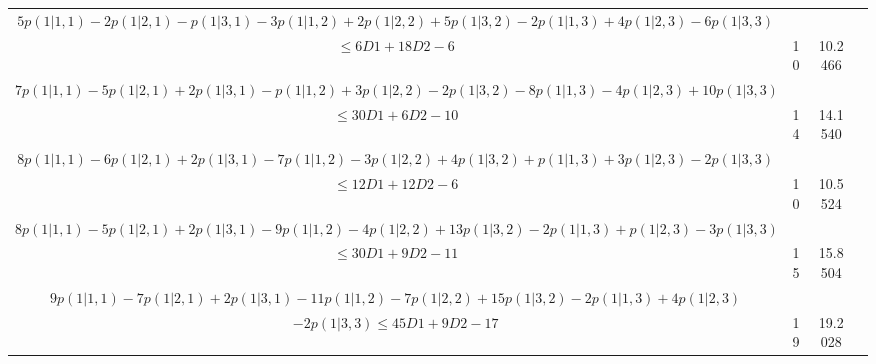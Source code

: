 \documentclass[11pt]{article}
\begin{document}
\begin{table}[htbp]
{\begin{tabular}{|c|c|c|c|}
    $5p(1|1,1) -2p(1|2,1) -p(1|3,1) -3p(1|1,2) +2p(1|2,2) +5p(1|3,2) -2p(1|1,3) +4p(1|2,3) -6p(1|3,3)$&&\\$ \leqslant 6D1 +18D2  -6$& 10 & 10.2466 \\ \hline

    $7p(1|1,1) -5p(1|2,1) +2p(1|3,1) -p(1|1,2) +3p(1|2,2) -2p(1|3,2) -8p(1|1,3) -4p(1|2,3) +10p(1|3,3)$&&\\$ \leqslant 30D1 +6D2  -10$&14 & 14.1540 \\ \hline

    $8p(1|1,1) -6p(1|2,1) +2p(1|3,1) -7p(1|1,2) -3p(1|2,2) +4p(1|3,2) +p(1|1,3) +3p(1|2,3) -2p(1|3,3)$&&\\$ \leqslant 12D1 +12D2  -6$&10 & 10.5524  \\ \hline

    $8p(1|1,1) -5p(1|2,1) +2p(1|3,1) -9p(1|1,2) -4p(1|2,2) +13p(1|3,2) -2p(1|1,3) +p(1|2,3) -3p(1|3,3)$&&\\$ \leqslant 30D1 +9D2  -11$&15 & 15.8504 \\ \hline

    $9p(1|1,1) -7p(1|2,1) +2p(1|3,1) -11p(1|1,2) -7p(1|2,2) +15p(1|3,2) -2p(1|1,3) +4p(1|2,3)$&&\\$ -2p(1|3,3) \leqslant 45D1 +9D2  -17$ & 19 &  19.2028 \\ \hline

    \end{tabular}
}
\end{table}
\end{document}

